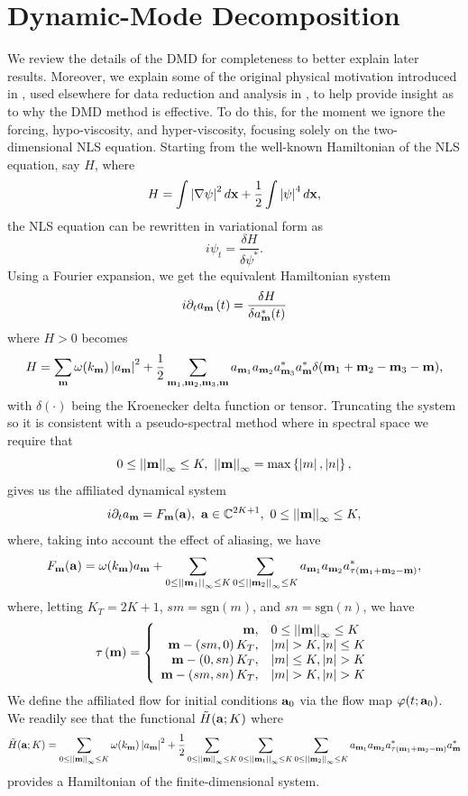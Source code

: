 \documentclass[aps,prl,preprint,groupedaddress]{revtex4-1}
\newcommand{\ba}{\begin{array}}
\newcommand{\ea}{\end{array}}
\newcommand{\pd}{\partial}
\newcommand{\gnorm}[1]{\left|\left| #1\right|\right|}
\begin{document}
\section*{Dynamic-Mode Decomposition}
We review the details of the DMD for completeness to better explain later results.  Moreover, we explain some of the original physical motivation introduced in \cite{koopman}, used elsewhere for data reduction and analysis in \cite{chorin}, to help provide insight as to why the DMD method is effective.   To do this, for the moment we ignore the forcing, hypo-viscosity, and hyper-viscosity, focusing solely on the two-dimensional NLS equation.   Starting from the well-known Hamiltonian of the NLS equation, say $H$, where 
\[
H = \int \left|\nabla \psi \right|^{2}d{\bf x} + \frac{1}{2}\int \left| \psi\right|^{4}d{\bf x},
\]
the NLS equation can be rewritten in variational form as 
\[
i\psi_{t} = \frac{\delta H}{\delta \psi^{\ast}}.
\]
Using a Fourier expansion, we get the equivalent Hamiltonian system 
\[
i\pd_{t}a_{{\bf m}}\left(t\right) = \frac{\delta H}{\delta a^{\ast}_{{\bf m}}(t)}
\]
where $H>0$ becomes
\[
H = \sum_{{\bf m}}\omega(k_{{\bf m}})\left| a_{{\bf m}} \right|^{2}
+ \frac{1}{2}\sum_{{\bf m}_{1},{\bf m}_{2},{\bf m}_{3},{\bf m}} a_{{\bf m}_{1}} a_{{\bf m}_{2}}  a^{\ast}_{{\bf m}_{3}} a^{\ast}_{{\bf m}} \delta({\bf m}_{1}+{\bf m}_{2}-{\bf m}_{3}-{\bf m}),
\]
with $\delta(\cdot)$ being the Kroenecker delta function or tensor.  Truncating the system so it is consistent with a pseudo-spectral method where in spectral space we require that 
\[
0\leq\gnorm{{\bf m}}_{\infty}\leq K, ~ \gnorm{{\bf m}}_{\infty} = \max\left\{\left|m\right|,\left|n\right|\right\},
\]
gives us the affiliated dynamical system 
\[
i\pd_{t}a_{{\bf m}} = F_{\bf m}({\bf a}), ~ {\bf a} \in \mathbb{C}^{2K+1}, ~ 0\leq \gnorm{{\bf m}}_{\infty} \leq K,
\]
where, taking into account the effect of aliasing, we have  
\[
F_{\bf m}({\bf a}) = \omega(k_{{\bf m}})a_{{\bf m}} 
+ \sum_{0\leq\gnorm{{\bf m}_{1}}_{\infty}\leq K}\sum_{0\leq\gnorm{{\bf m}_{2}}_{\infty}\leq K}a_{{\bf m}_{1}} a_{{\bf m}_{2}} a^{\ast}_{\tau({\bf m}_{1}+{\bf m}_{2}-{\bf m})},
\]
where, letting $K_{T}=2K+1$, $sm=\mbox{sgn}(m)$, and $sn=\mbox{sgn}(n)$, we have 
\[
\tau\left({\bf m}\right) = 
\left\{
\ba{rl} 
{\bf m}, & 0\leq \gnorm{{\bf m}}_{\infty} \leq K\\   
{\bf m} -\left(sm,0\right) K_{T}, & |m|>K, |n|\leq K \\
{\bf m} -\left(0,sn\right)K_{T}, & |m|\leq K, |n|>K \\
{\bf m} - \left(sm,sn\right)K_{T}, & |m| > K, |n| > K \\
\ea
\right.
\]
We define the affiliated flow for initial conditions ${\bf a}_{0}$ via the flow map $\varphi(t;{\bf a}_{0})$.  We readily see that the functional $\tilde{H}({\bf a};K)$ where 
\[
\tilde{H}({\bf a};K) = \sum_{0\leq \gnorm{{\bf m}}_{\infty}\leq K} \omega(k_{{\bf m}})\left| a_{{\bf m}} \right|^{2} + \frac{1}{2}\sum_{0\leq \gnorm{{\bf m}}_{\infty}\leq K} \sum_{0\leq\gnorm{{\bf m}_{1}}_{\infty}\leq K}\sum_{0\leq\gnorm{{\bf m}_{2}}_{\infty}\leq K}a_{{\bf m}_{1}} a_{{\bf m}_{2}} a^{\ast}_{\tau({\bf m}_{1}+{\bf m}_{2}-{\bf m})}a^{\ast}_{{\bf m}}
\]
provides a Hamiltonian of the finite-dimensional system.  
\end{document}
